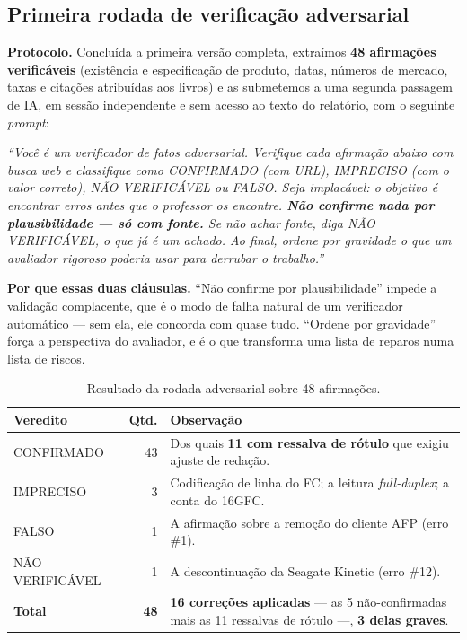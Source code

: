\documentclass[11pt,a4paper]{article}
\begin{document}
\subsection{Primeira rodada de verificação adversarial}
\label{sec:adversarial}

\textbf{Protocolo.} Concluída a primeira versão completa, extraímos \textbf{48 afirmações
verificáveis} (existência e especificação de produto, datas, números de mercado, taxas e citações
atribuídas aos livros) e as submetemos a uma segunda passagem de IA, em sessão independente e sem
acesso ao texto do relatório, com o seguinte \textit{prompt}:

\begin{center}\begin{minipage}{0.94\textwidth}
\colorbox{fundo}{\begin{minipage}{\dimexpr\linewidth-2\fboxsep}
\vspace{4pt}\small\itshape
``Você é um verificador de fatos adversarial. Verifique cada afirmação abaixo com busca web e
classifique como CONFIRMADO (com URL), IMPRECISO (com o valor correto), NÃO VERIFICÁVEL ou FALSO.
Seja implacável: o objetivo é encontrar erros antes que o professor os encontre. \textbf{Não confirme
nada por plausibilidade --- só com fonte.} Se não achar fonte, diga NÃO VERIFICÁVEL, o que já é um
achado. Ao final, ordene por gravidade o que um avaliador rigoroso poderia usar para derrubar o
trabalho.''
\vspace{5pt}
\end{minipage}}
\end{minipage}\end{center}

\textbf{Por que essas duas cláusulas.} ``Não confirme por plausibilidade'' impede a validação
complacente, que é o modo de falha natural de um verificador automático --- sem ela, ele concorda com
quase tudo. ``Ordene por gravidade'' força a perspectiva do avaliador, e é o que transforma uma
lista de reparos numa lista de riscos.

\begin{table}[H]
\centering
\caption{Resultado da rodada adversarial sobre 48 afirmações.}
\label{tab:adversarial}
{\small
\begin{tabular}{@{}lrp{8.0cm}@{}}
\toprule
\textbf{Veredito} & \textbf{Qtd.} & \textbf{Observação} \\
\midrule
CONFIRMADO & 43 & Dos quais \textbf{11 com ressalva de rótulo} que exigiu ajuste de redação. \\
IMPRECISO & 3 & Codificação de linha do FC; a leitura \textit{full-duplex}; a conta do 16GFC. \\
FALSO & 1 & A afirmação sobre a remoção do cliente AFP (erro \#1). \\
NÃO VERIFICÁVEL & 1 & A descontinuação da Seagate Kinetic (erro \#12). \\
\midrule
\textbf{Total} & \textbf{48} & \textbf{16 correções aplicadas} --- as 5 não-confirmadas mais as 11
ressalvas de rótulo ---, \textbf{3 delas graves}. \\
\bottomrule
\end{tabular}}
\end{table}
\end{document}
